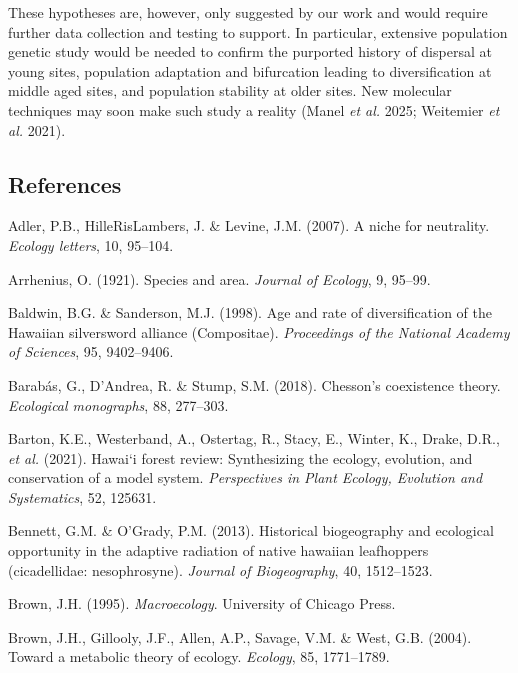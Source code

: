 \documentclass[
  letterpaper,
  DIV=11,
  numbers=noendperiod]{scrartcl}
\newlength{\cslhangindent}
\newenvironment{CSLReferences}[2] %
 {\begin{list}{}{%
  \setlength{\itemindent}{0pt}
  \setlength{\leftmargin}{0pt}
  \setlength{\parsep}{0pt}
  \ifodd #1
   \setlength{\leftmargin}{\cslhangindent}
   \setlength{\itemindent}{-1\cslhangindent}
  \fi
  \setlength{\itemsep}{#2\baselineskip}}}
 {\end{list}}
\begin{document}
These hypotheses are, however, only suggested by our work and would
require further data collection and testing to support. In particular,
extensive population genetic study would be needed to confirm the
purported history of dispersal at young sites, population adaptation and
bifurcation leading to diversification at middle aged sites, and
population stability at older sites. New molecular techniques may soon
make such study a reality (Manel \emph{et al.} 2025; Weitemier \emph{et
al.} 2021).

\subsection*{References}\label{references}

\label{refs}
\begin{CSLReferences}{1}{0}
Adler, P.B., HilleRisLambers, J. \& Levine, J.M. (2007). A niche for
neutrality. \emph{Ecology letters}, 10, 95--104.

Arrhenius, O. (1921). Species and area. \emph{Journal of Ecology}, 9,
95--99.

Baldwin, B.G. \& Sanderson, M.J. (1998). Age and rate of diversification
of the {Hawaiian} silversword alliance ({Compositae}). \emph{Proceedings
of the National Academy of Sciences}, 95, 9402--9406.

Barabás, G., D'Andrea, R. \& Stump, S.M. (2018). Chesson's coexistence
theory. \emph{Ecological monographs}, 88, 277--303.

Barton, K.E., Westerband, A., Ostertag, R., Stacy, E., Winter, K.,
Drake, D.R., \emph{et al.} (2021). Hawai`i forest review: Synthesizing
the ecology, evolution, and conservation of a model system.
\emph{Perspectives in Plant Ecology, Evolution and Systematics}, 52,
125631.

Bennett, G.M. \& O'Grady, P.M. (2013). Historical biogeography and
ecological opportunity in the adaptive radiation of native hawaiian
leafhoppers (cicadellidae: nesophrosyne). \emph{Journal of
Biogeography}, 40, 1512--1523.

Brown, J.H. (1995). \emph{Macroecology}. University of Chicago Press.

Brown, J.H., Gillooly, J.F., Allen, A.P., Savage, V.M. \& West, G.B.
(2004). Toward a metabolic theory of ecology. \emph{Ecology}, 85,
1771--1789.


\end{CSLReferences}
\end{document}
